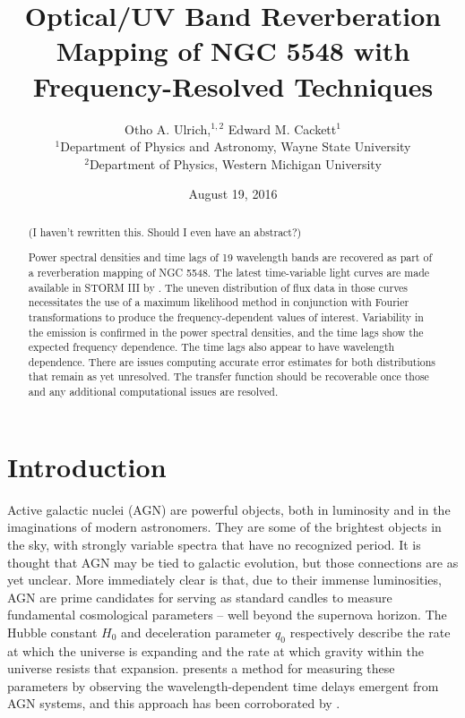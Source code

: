 \documentclass[11pt,letterpaper]{article}
\begin{document}
\title{Optical/UV Band
Reverberation Mapping of NGC 5548 with Frequency-Resolved Techniques}

\author{Otho A. Ulrich,$^{1,2}$ Edward M. Cackett$^{1}$
\\
$^{1}$Department of Physics and Astronomy, Wayne State University\\
$^{2}$Department of Physics, Western Michigan University\\
}
\date{August 19, 2016}

\maketitle

\begin{abstract}
(I haven't rewritten this. Should I even have an abstract?)

Power spectral densities and time lags of 19 wavelength bands are recovered as part of a reverberation mapping of NGC 5548. The latest time-variable light curves are made available in STORM III by \cite{2016ApJ...821...56F}. The uneven distribution of flux data in those curves necessitates the use of a maximum likelihood method in conjunction with Fourier transformations to produce the frequency-dependent values of interest. Variability in the emission is confirmed in the power spectral densities, and the time lags show the expected frequency dependence. The time lags also appear to have wavelength dependence. There are issues computing accurate error estimates for both distributions that remain as yet unresolved. The transfer function should be recoverable once those and any additional computational issues are resolved.

\end{abstract}


\section{Introduction}
\label{sec:intro}

Active galactic nuclei (AGN) are powerful objects, both in luminosity and in the imaginations of modern astronomers. They are some of the brightest objects in the sky, with strongly variable spectra that have no recognized period. It is thought that AGN may be tied to galactic evolution, but those connections are as yet unclear. More immediately clear is that, due to their immense luminosities, AGN are prime candidates for serving as standard candles to measure fundamental cosmological parameters -- well beyond the supernova horizon. The Hubble constant $H_0$ and deceleration parameter $q_0$ respectively describe the rate at which the universe is expanding and the rate at which gravity within the universe resists that expansion. \cite{1999MNRAS.302L..24C} presents a method for measuring these parameters by observing the wavelength-dependent time delays emergent from AGN systems, and this approach has been corroborated by \cite{2007MNRAS.380..669C}.
\end{document}
